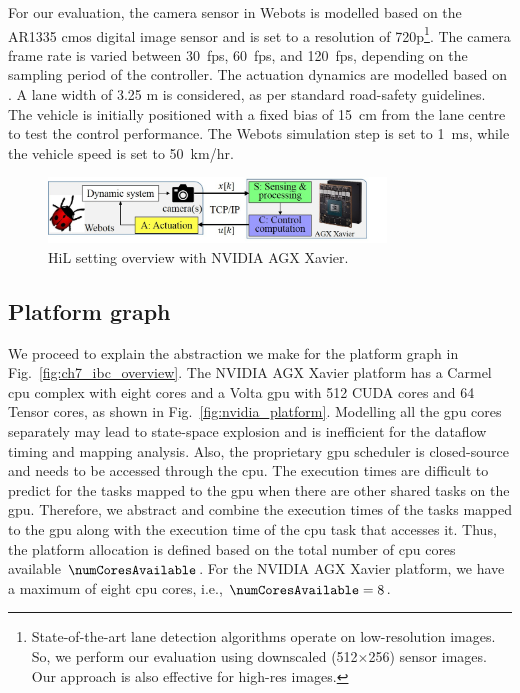 For our evaluation, the camera sensor in Webots is modelled based on the AR1335 \gls{cmos} digital image sensor \cite{camsensor} and is set to a resolution of 720p\footnote{State-of-the-art lane detection algorithms \cite{NvidiaLanenet} operate on low-resolution images. So, we perform our evaluation using downscaled (512$\times$256) sensor images. Our approach is also effective for high-res images.}. The camera frame rate is varied between 30~fps, 60~fps, and 120~fps, depending on the sampling period of the controller. The actuation dynamics are modelled based on \cite{RandyFrank2016}. A lane width of 3.25 m is considered, as per standard road-safety guidelines.
The vehicle is initially positioned with a fixed bias of 15~cm from the lane centre to test the control performance.
The Webots simulation step is set to 1~ms, while the vehicle speed is set to 50~km/hr.
\begin{figure}[t]
\centerline{
    \includegraphics[width=0.8\textwidth]{images/hil.jpg}
    }
    \caption{HiL setting overview with NVIDIA AGX Xavier.}
    \label{fig:ch7_hil}
\end{figure}

\subsection{Platform graph}
We proceed to explain the abstraction we make for the platform graph in Fig.~\ref{fig:ch7_ibc_overview}.
The NVIDIA AGX Xavier platform has a Carmel \gls{cpu} complex with eight cores and a Volta \gls{gpu} with 512 CUDA cores and 64 Tensor cores, as shown in Fig.~\ref{fig:nvidia_platform}.
 Modelling all the \gls{gpu} cores separately may lead to state-space explosion and is inefficient for the dataflow timing and mapping analysis.
Also, the proprietary \gls{gpu} scheduler is closed-source and needs to be accessed through the \gls{cpu}.
The execution times are difficult to predict for the tasks mapped to the \gls{gpu} when there are other shared tasks on the \gls{gpu}.
 Therefore, we abstract and combine the execution times of the tasks mapped to the \gls{gpu} along with the execution time of the \gls{cpu} task that accesses it.
  Thus, the platform allocation is defined based on the total number of \gls{cpu} cores available $\numCoresAvailable$. For the NVIDIA AGX Xavier platform, we have a maximum of eight \gls{cpu} cores, i.e., $\numCoresAvailable=8$.
 
